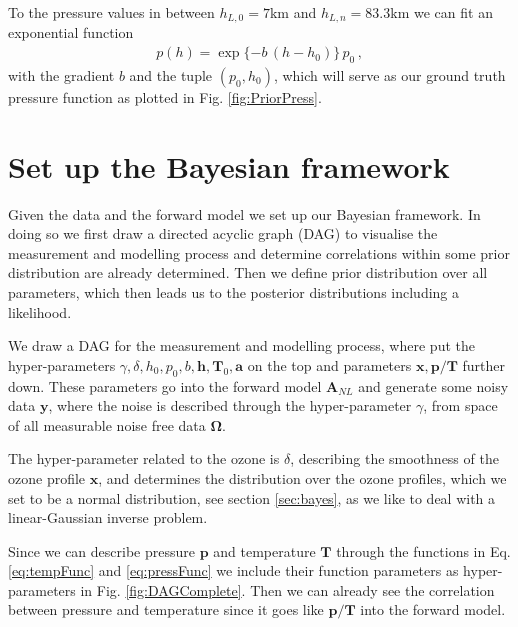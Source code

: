 To the pressure values in between $h_{L,0}=7$km and $h_{L,n} = 83.3$km we can fit an exponential function
\begin{align}
	p(h) =
	\exp{ \{ -b \,  (h - h_{0} ) \} } \,  p_0 \, ,
	\label{eq:pressFunc}
\end{align}
with the gradient $b$ and the tuple $(p_0,h_{0})$, which will serve as our ground truth pressure function as plotted in Fig. \ref{fig:PriorPress}.


\section{Set up the Bayesian framework}
\label{sec:BayModel}

Given the data and the forward model we set up our Bayesian framework.
In doing so we first draw a directed acyclic graph (DAG) to visualise the measurement and modelling process and determine correlations within some prior distribution are already determined.
Then we define prior distribution over all parameters, which then leads us to the posterior distributions including a likelihood.

We draw a DAG for the measurement and modelling process, where put the hyper-parameters $\gamma, \delta, h_0, p_0, b, \bm{h}, \bm{T}_0, \bm{a}$ on the top and parameters $\bm{x}, \bm{p}/\bm{T}$ further down.
These parameters go into the forward model $\bm{A}_{NL}$ and generate some noisy data $\bm{y}$, where the noise is described through the hyper-parameter $\gamma$, from space of all measurable noise free data $\bm{\Omega}$.

The hyper-parameter related to the ozone is $\delta$, describing the smoothness of the ozone profile $\bm{x}$, and determines the distribution over the ozone profiles, which we set to be a normal distribution, see section \ref{sec:bayes}, as we like to deal with a linear-Gaussian inverse problem.

Since we can describe pressure $\bm{p}$ and temperature $\bm{T}$ through the functions in Eq. \ref{eq:tempFunc} and \ref{eq:pressFunc} we include their function parameters as hyper-parameters in Fig. \ref{fig:DAGComplete}.
Then we can already see the correlation between pressure and temperature since it goes like $\bm{p}/ \bm{T}$ into the forward model.

